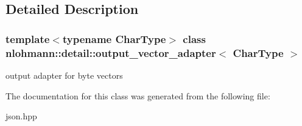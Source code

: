 \subsection{Detailed Description}
\subsubsection*{template$<$typename Char\+Type$>$\newline
class nlohmann\+::detail\+::output\+\_\+vector\+\_\+adapter$<$ Char\+Type $>$}

output adapter for byte vectors 

The documentation for this class was generated from the following file\+:\begin{DoxyCompactItemize}
\item 
json.\+hpp\end{DoxyCompactItemize}
